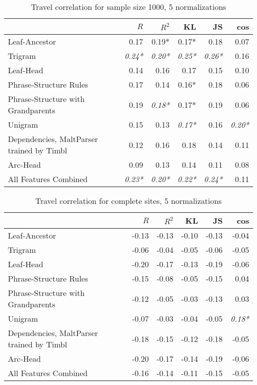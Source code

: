 \begin{table}
\begin{tabular}{l|rrrrr}
& $R$ & $R^2$ & KL & JS & cos  \\ \hline
  Leaf-Ancestor&0.17 & 0.19* & 0.17* & 0.18 & 0.07\\
  Trigram&\textit{0.24*} & \textit{0.20*} & \textit{0.25*} & \textit{0.26*} & 0.16\\
  Leaf-Head&0.14 & 0.16 & 0.17 & 0.15 & 0.10\\
  Phrase-Structure Rules&0.17 & 0.14 & 0.16* & 0.18 & 0.06\\
  Phrase-Structure with Grandparents&0.19 & \textit{0.18*} & 0.17* & 0.19 & 0.06\\
  Unigram&0.15 & 0.13 & \textit{0.17*} & 0.16 & \textit{0.20*}\\
  Dependencies, MaltParser trained by Timbl&0.12 & 0.16 & 0.18 & 0.14 & 0.11\\
  Arc-Head&0.09 & 0.13 & 0.14 & 0.11 & 0.08\\
  All Features Combined&\textit{0.23*} & \textit{0.20*} & \textit{0.22*} & \textit{0.24*} & 0.11\\
\end{tabular}
 \caption{Travel correlation for sample size 1000, 5 normalizations}
 \label{travel-cor-5-1000}
\end{table}

\begin{table}
\begin{tabular}{l|rrrrr}
& $R$ & $R^2$ & KL & JS & cos  \\ \hline
  Leaf-Ancestor&-0.13 & -0.13 & -0.10 & -0.13 & -0.04\\
  Trigram&-0.06 & -0.04 & -0.05 & -0.06 & -0.05\\
  Leaf-Head&-0.20 & -0.17 & -0.13 & -0.19 & -0.06\\
  Phrase-Structure Rules&-0.15 & -0.08 & -0.05 & -0.15 & 0.04\\
  Phrase-Structure with Grandparents&-0.12 & -0.05 & -0.03 & -0.13 & 0.03\\
  Unigram&-0.07 & -0.03 & -0.04 & -0.05 & \textit{0.18*}\\
  Dependencies, MaltParser trained by Timbl&-0.18 & -0.15 & -0.12 & -0.18 & -0.05\\
  Arc-Head&-0.20 & -0.17 & -0.14 & -0.19 & -0.06\\
  All Features Combined&-0.16 & -0.14 & -0.11 & -0.15 & -0.05\\
\end{tabular}
 \caption{Travel correlation for complete sites, 5 normalizations}
 \label{travel-cor-5-full}
\end{table}

